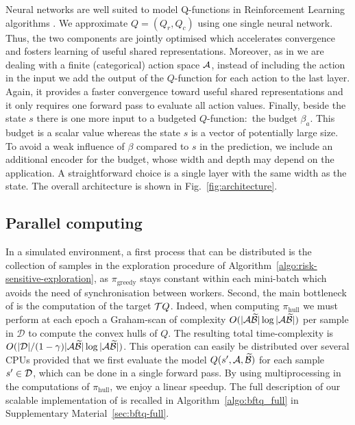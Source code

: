 \documentclass{article}
\begin{document}
Neural networks are well suited to model Q-functions in Reinforcement Learning algorithms \citep{Riedmiller2005,Mnih2015}.  We approximate $Q = (Q_r, Q_c)$ using one single neural network. Thus, the two components are jointly optimised which accelerates convergence and fosters learning of useful shared representations. Moreover, as in \citep{Mnih2015} we are dealing with a finite (categorical) action space $\mathcal{A}$, instead of including the action in the input we add the output of the $Q$-function for each action to the last layer. Again, it provides a faster convergence toward useful shared representations and it only requires one forward pass to evaluate all action values. Finally, beside the state $s$ there is one more input to a budgeted $Q$-function:~the budget $\beta_a$. This budget is a scalar value whereas the state $s$ is a vector of potentially large size. To avoid a weak influence of $\beta$ compared to $s$ in the prediction, we include an additional encoder for the budget, whose width and depth may depend on the application. A straightforward choice is a single layer with the same width as the state. The overall architecture is shown in Fig.~\ref{fig:architecture}.

\subsection{Parallel computing}

In a simulated environment, a first process that can be distributed is the collection of samples in the exploration procedure of Algorithm~\ref{algo:risk-sensitive-exploration}, as $\pi_\text{greedy}$ stays constant within each mini-batch which avoids the need of synchronisation between workers. Second, the main bottleneck of \BFTQ is the computation of the target $\mathcal{T} Q$. Indeed, when computing $\pi_\text{hull}$ we must perform at each epoch a Graham-scan of complexity $O(|\mathcal{A}\widetilde{\mathcal{B}}| \log |\mathcal{A}\widetilde{\mathcal{B}}|)$ per sample in $\mathcal{D}$ to compute the convex hulls of $Q$. The resulting total time-complexity is $O(|\mathcal{D}|/(1-\gamma) |\mathcal{A}\widetilde{\mathcal{B}}| \log |\mathcal{A}\widetilde{\mathcal{B}}|)$. This operation can easily be distributed over several CPUs provided that we first evaluate the model $Q(s',\mathcal{A},\widetilde{\mathcal{B}})$ for each sample $s'\in\mathcal{D}$, which can be done in a single forward pass. By using multiprocessing in the computations of $\pi_\text{hull}$, we enjoy a linear speedup.%
The full description of our scalable implementation of \BFTQ is recalled in Algorithm~\ref{algo:bftq_full} in Supplementary Material~\ref{sec:bftq-full}.
\end{document}
